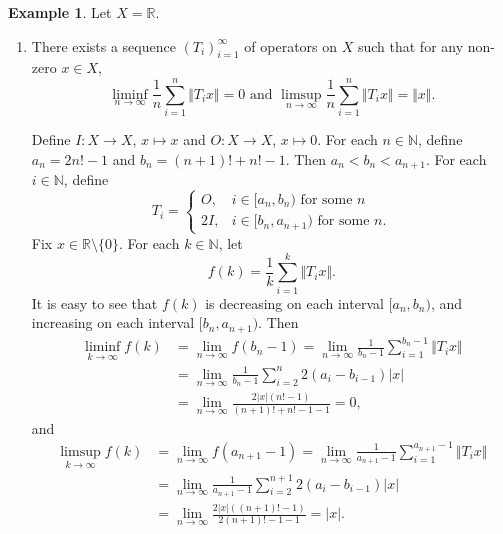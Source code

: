 \documentclass[12pt,a4paper]{amsart}
\theoremstyle{definition}
\newtheorem{exam}[defn]{Example}
\theoremstyle{plain}
\begin{document}
\begin{exam}\label{exam:Ti-R}
    Let $X=\mathbb{R}$.
    \begin{enumerate}
        \item \label{Ex: 1}
        There exists a sequence $(T_i)_{i=1}^{\infty}$ of operators on $X$ such that for any non-zero $x\in X$,
              \[
                  \liminf_{n\to\infty}
                  \frac{1}{n}\sum_{i=1}^{n}\Vert T_i x\Vert=0 \text { and }
                  \limsup_{n\to\infty}
                  \frac{1}{n}\sum_{i=1}^{n}\Vert T_i x\Vert=\Vert x\Vert.
              \]

              Define $I\colon X\to X$, $x\mapsto x$ and $O\colon X\to X$, $x\mapsto 0$.
              For each $n\in\mathbb{N}$, define $a_n=2n!-1$ and $b_n=(n+1)!+n!-1$.
              Then $a_n<b_n<a_{n+1}$.
              For each $i\in\mathbb{N}$, define
              \[
                  T_i=\begin{cases}
                      O,  & i\in [a_n,b_n) \text{ for some } n      \\
                      2I, & i\in [b_n,a_{n+1}) \text{ for some } n.
                  \end{cases}
              \]
              Fix $x\in \mathbb{R}\setminus\{0\}$.
              For each $k\in\mathbb{N}$, let
              \[
                  f(k)= \frac{1}{k}\sum_{i=1}^k \Vert T_i x \Vert.
              \]
              It is easy to see that $f(k)$ is decreasing on each interval $[a_n,b_n)$,
              and increasing on each interval $[b_n,a_{n+1})$.
              Then
              \begin{align*}
                  \liminf_{k\to\infty} f(k) & = \lim_{n\to\infty} f(b_n-1)=  \lim_{n\to\infty}\frac{1}{b_n-1}\sum_{i=1}^{b_n-1} \Vert T_i x\Vert \\
               & = \lim_{n\to\infty}\frac{1}{b_n-1} \sum_{i=2}^n 2(a_i-b_{i-1})|x| \\
               &= \lim_{n\to\infty} \frac{2|x| (n!-1) }{ (n+1)!+ n!-1 -1} =0,
              \end{align*}
              and
              \begin{align*}
                  \limsup_{k\to\infty} f(k) & = \lim_{n\to\infty} f(a_{n+1}-1)
                  =  \lim_{n\to\infty}\frac{1}{a_{n+1}-1}\sum_{i=1}^{a_{n+1}-1} \Vert T_i x\Vert\\
                 & =\lim_{n\to\infty}\frac{1}{a_{n+1}-1} \sum_{i=2}^{n+1} 2(a_i-b_{i-1})|x| \\
                 & = \lim_{n\to\infty} \frac{2|x|  ( (n+1)!-1  ) }{ 2(n+1)!-1-1 }  =|x|.
              \end{align*}


\end{enumerate}
\end{exam}
\end{document}
